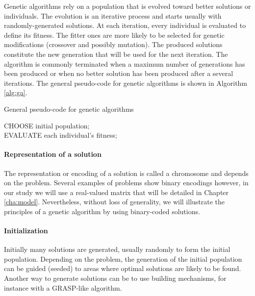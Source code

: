 Genetic algorithms rely on a population that is evolved toward better solutions or individuals. The evolution is an iterative process and starts usually with randomly-generated solutions. At each iteration, every individual is evaluated to define its fitness. The fitter ones are more likely to be selected for genetic modifications (crossover and possibly mutation). The produced solutions constitute the new generation that will be used for the next iteration. The algorithm is commonly terminated when a maximum number of generations has been produced or when no better solution has been produced after a several iterations. The general pseudo-code for genetic algorithms is shown in Algorithm \ref{alg:ga}.

\begin{algorithm}[h!]
\caption{General pseudo-code for genetic algorithms}
\label{alg:ga}
CHOOSE initial population;\\
EVALUATE each individual's fitness;\\
\end{algorithm}

\paragraph{Representation of a solution}
The representation or encoding of a solution is called a chromosome and depends on the problem. Several examples of problems show binary encodings however, in our study we will use a real-valued matrix that will be detailed in Chapter \ref{cha:model}. Nevertheless, without loss of generality, we will illustrate the principles of a genetic algorithm by using binary-coded solutions.

\paragraph{Initialization}
Initially many solutions are generated, usually randomly to form the initial population. Depending on the problem, the generation of the initial population can be guided (seeded) to areas where optimal solutions are likely to be found. Another way to generate solutions can be to use building mechanisms, for instance with a GRASP-like algorithm.

